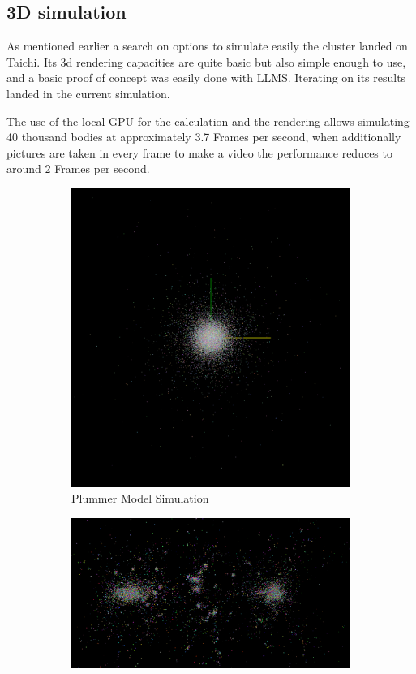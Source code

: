 \documentclass[a4paper, 11pt]{article}         %
\begin{document}
\subsection{3D simulation}
As mentioned earlier a search on options to simulate easily the cluster landed on Taichi. Its 3d rendering capacities are quite basic but also simple enough to use,
and a basic proof of concept was easily done with LLMS. Iterating on its results landed in the current simulation.

The use of the local GPU for the calculation and the rendering allows simulating 40 thousand bodies at approximately 3.7 Frames per second, when additionally pictures are taken in every frame to make a video the performance reduces to around 2 Frames per second.

\begin{figure}
\centering
\begin{subfigure}{.5\textwidth}
  \centering
  \includegraphics[clip, trim=6cm 6cm 6cm 6cm,width=\linewidth]{images/simulation}
  \caption{Plummer Model Simulation}
  \label{fig:time}
\end{subfigure}%
\begin{subfigure}{.5\textwidth}
  \centering
  \includegraphics[clip, trim=6cm 0cm 6cm 0cm, width=\linewidth]{images/simulation2}

\end{subfigure}
\end{figure}
\end{document}
